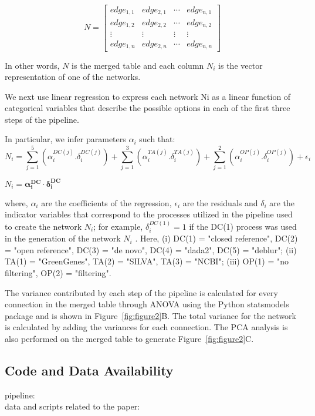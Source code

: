   \begin{equation*}
    N = \begin{bmatrix}
     edge_{1,1} & edge_{2,1} & \cdots  & edge_{n, 1} \\ 
     edge_{1,2} & edge_{2,2} & \cdots  & edge_{n, 2} \\ 
     \vdots & \vdots & \vdots  & \vdots \\ 
     edge_{1,n} & edge_{2,n} & \cdots  & edge_{n, n}
    \end{bmatrix}      
  \end{equation*}
  
In other words, $N$ is the merged table and each column $N_i$ is the vector representation of one of the networks.
  
We next use linear regression to express each network Ni as a linear function of categorical variables that describe the possible options in each of the first three steps of the pipeline.
  

In particular, we infer parameters $\alpha_i$ such that:
   \begin{equation*}
       N_i = \sum_{j=1}^5 \left( \alpha^{DC(j)}_i.\delta^{DC(j)}_i \right) +
             \sum_{j=1}^3 \left( \alpha^{TA(j)}_i.\delta^{TA(j)}_i \right) +
             \sum_{j=1}^2 \left( \alpha^{OP(j)}_i.\delta^{OP(j)}_i \right) +
             \epsilon_i
   \end{equation*}
   
   
   $N_i = \mathbf{\alpha_i^{DC}} \cdot \mathbf{ \delta_i^{DC}}$
   
   where, $\alpha_i$ are the coefficients of the regression, $\epsilon_i$ are the residuals and $\delta_i$ are the indicator variables that correspond to the processes utilized in the pipeline used to create the network $N_i$; for example, $\delta^{DC(1)}_i = 1$ if the DC(1) process was used in the generation of the network $N_i$ .
   Here, (i) DC(1) = "closed reference", DC(2) = "open reference", DC(3) = "de novo", DC(4) = "dada2", DC(5) = "deblur"; (ii)  TA(1) = "GreenGenes", TA(2) = "SILVA", TA(3) = "NCBI"; (iii) OP(1) = "no filtering", OP(2) = "filtering".
   
  The variance contributed by each step of the pipeline is calculated for every connection in the merged table through ANOVA using the Python statsmodels package and is shown in Figure~\ref{fig:figure2}B.
  The total variance for the network is calculated by adding the variances for each connection.
  The PCA analysis is also performed on the merged table to generate Figure~\ref{fig:figure2}C.

  \subsection*{Code and Data Availability}
  pipeline: \href{}{} \\
  data and scripts related to the paper: \href{}{}